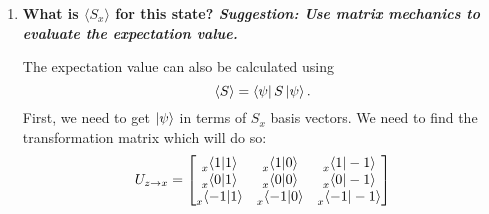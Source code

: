 \documentclass[11pt]{article}
\DeclarePairedDelimiter\abs{\lvert}{\rvert}
\begin{document}
\begin{enumerate}[label=\textbf{\arabic*.}]
{\begin{enumerate}[label=\textbf{(\alph*)}]
{                    The probability of \(-\hbar\):
                    \begin{align*}
                        \abs{\braket{\psi|1}}^2&=\abs*{\frac{1}{\sqrt{14}}\begin{bmatrix}1 & 2 & -3i\end{bmatrix}\begin{bmatrix}0 \\ 0 \\ 1\end{bmatrix}}^2 \\
                        &=\frac{1}{14}\abs*{-3i}^2 \\
                        \Aboxed{\abs{\braket{\psi|1}}^2&=\frac{9}{14}}
                    \end{align*}
                    The expectation value can be calculated with
                    \begin{equation*}
                        \langle S\rangle=\sum_iP_ia_i
                    \end{equation*}
                    where \(S\) is the operator, and \(P_i\) is the probability of measuring the \(i\)th eigenvalue (\(a_i\)) of that operator. For \(S_z\), this is
                    \begin{align*}
                        \langle S_z\rangle&=\frac{1}{14}\hbar+\frac{2}{7}\cdot0+\frac{9}{14}\cdot-\hbar \\
                        \Aboxed{\langle S_z\rangle&=-\frac{5}{7}\hbar}.
                    \end{align*}
                }
                \item{
                    \textbf{\boldmath What is \(\langle S_x\rangle\) for this state? \textit{Suggestion: Use matrix mechanics to evaluate the expectation value.}}
                    \par
                    The expectation value can also be calculated using
                    \begin{equation*}
                        \langle S\rangle=\bra{\psi}S\ket{\psi}.
                    \end{equation*}
                    First, we need to get \(\ket{\psi}\) in terms of \(S_x\) basis vectors. We need to find the transformation matrix which will do so:
                    \begin{align*}
                        U_{z\rightarrow x}=\begin{bmatrix}\prescript{}{x}{\braket{1|1}} & \prescript{}{x}{\braket{1|0}} & \prescript{}{x}{\braket{1|-1}} \\ \prescript{}{x}{\braket{0|1}} & \prescript{}{x}{\braket{0|0}} & \prescript{}{x}{\braket{0|-1}} \\ \prescript{}{x}{\braket{-1|1}} & \prescript{}{x}{\braket{-1|0}} & \prescript{}{x}{\braket{-1|-1}}\end{bmatrix}

\end{align*}}
\end{enumerate}}
\end{enumerate}
\end{document}
